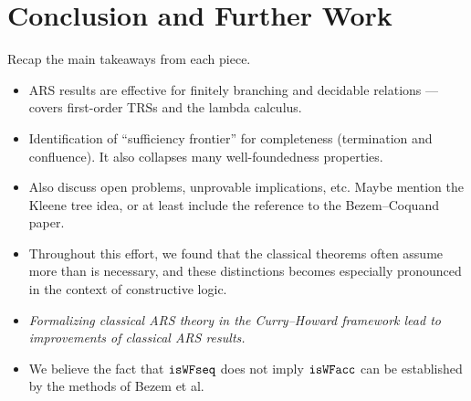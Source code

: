 \section{Conclusion and Further Work}
\label{sec:Conclusion}

Recap the main takeaways from each piece.
\begin{itemize}
  \item ARS results are effective for finitely branching and decidable relations
  --- covers first-order TRSs and the lambda calculus.
  \item Identification of ``sufficiency frontier'' for completeness (termination and confluence).
  It also collapses many well-foundedness properties.
  \item Also discuss open problems, unprovable implications, etc.
  Maybe mention the Kleene tree idea, or at least include the reference to the Bezem--Coquand paper.
  \item Throughout this effort, we found that the classical theorems often assume
  more than is necessary, and these distinctions becomes especially pronounced
  in the context of constructive logic.
  \item \emph{Formalizing classical ARS theory in the Curry--Howard framework
  lead to improvements of classical ARS results.}
  \item We believe the fact that $\mathtt{isWFseq}$ does not imply $\mathtt{isWFacc}$
  can be established by the methods of Bezem et al.

\end{itemize}
